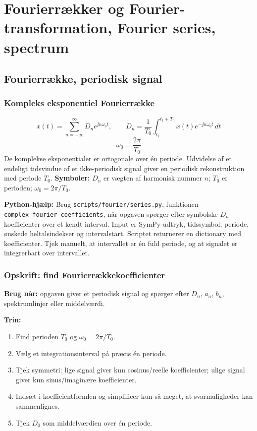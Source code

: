 \section{Fourierrækker og Fourier-transformation, Fourier series, spectrum}

\subsection{Fourierrække, periodisk signal}

\subsubsection{Kompleks eksponentiel Fourierrække}
\[
x(t)=\sum_{n=-\infty}^{\infty}D_n e^{\jj n\omega_0t},\qquad
D_n=\frac{1}{T_0}\int_{t_1}^{t_1+T_0}x(t)e^{-\jj n\omega_0t}\,dt
\]
\[
\omega_0=\frac{2\pi}{T_0}
\]
De komplekse eksponentialer er ortogonale over én periode. Udvidelse af et endeligt tidsvindue af et ikke-periodisk signal giver en periodisk rekonstruktion med periode \(T_0\).
\textbf{Symboler:} \(D_n\) er vægten af harmonisk nummer \(n\); \(T_0\) er perioden; \(\omega_0=2\pi/T_0\).

\textbf{Python-hjælp:} Brug \texttt{scripts/fourier/series.py}, funktionen \texttt{complex\_fourier\_coefficients}, når opgaven spørger efter symbolske \(D_n\)-koefficienter over et kendt interval. Input er SymPy-udtryk, tidssymbol, periode, ønskede heltalsindekser og intervalstart. Scriptet returnerer en dictionary med koefficienter. Tjek manuelt, at intervallet er én fuld periode, og at signalet er integrerbart over intervallet.

\subsubsection{Opskrift: find Fourierrækkekoefficienter}
\textbf{Brug når:} opgaven giver et periodisk signal og spørger efter \(D_n\), \(a_n\), \(b_n\), spektrumlinjer eller middelværdi.

\textbf{Trin:}
\begin{enumerate}
    \item Find perioden \(T_0\) og \(\omega_0=2\pi/T_0\).
    \item Vælg et integrationsinterval på præcis én periode.
    \item Tjek symmetri: lige signal giver kun cosinus/reelle koefficienter; ulige signal giver kun sinus/imaginære koefficienter.
    \item Indsæt i koefficientformlen og simplificer kun så meget, at svarmuligheder kan sammenlignes.
    \item Tjek \(D_0\) som middelværdien over én periode.
\end{enumerate}

